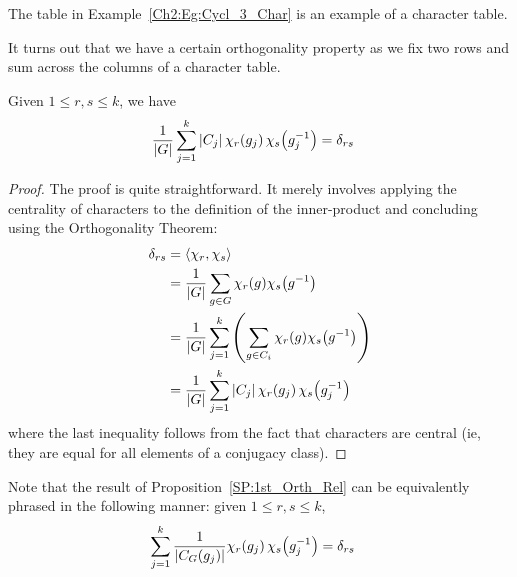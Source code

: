 The table in Example~\ref{Ch2:Eg:Cycl_3_Char} is an example of a character table.

It turns out that we have a certain orthogonality property as we fix two rows and sum across the columns of a character table.

\begin{boxproposition}\label{SP:1st_Orth_Rel}
    Given $1 \leq r, s \leq k$, we have
    \begin{align*}
        \frac{1}{\left\lvert G \right\rvert} \sum_{j=1}^{k} \left\lvert C_j \right\rvert \chi_r\!\left( g_j \right) \chi_s\!\left( g_j^{-1} \right) &= \delta_{rs}
    \end{align*}
\end{boxproposition}
\begin{proof}
    The proof is quite straightforward. It merely involves applying the centrality of characters to the definition of the inner-product and concluding using the Orthogonality Theorem:
    \begin{align*}
        \delta_{rs} &=
        \left\langle \chi_r, \chi_s \right\rangle \\
        &= \frac{1}{\left\lvert G \right\rvert} \sum_{g \in G} \chi_r(g) \chi_s\!\left( g^{-1} \right) \\
        &= \frac{1}{\left\lvert G \right\rvert} \sum_{j=1}^{k} \left( \sum_{g \in C_i} \chi_r(g) \chi_s\!\left( g^{-1} \right) \right) \\
        &= \frac{1}{\left\lvert G \right\rvert} \sum_{j=1}^{k} \left\lvert C_j \right\rvert \chi_r\!\left( g_j \right) \chi_s\!\left( g_j^{-1} \right)
    \end{align*}
    where the last inequality follows from the fact that characters are central (ie, they are equal for all elements of a conjugacy class).
\end{proof}
\begin{remark}
    Note that the result of Proposition~\ref{SP:1st_Orth_Rel} can be equivalently phrased in the following manner: given $1 \leq r, s \leq k$,
    \begin{align}
        \sum_{j=1}^{k} \frac{1}{\left\lvert C_G(g_j) \right\rvert} \chi_r\!\left( g_j \right) \chi_s\!\left( g_j^{-1} \right) &= \delta_{rs}
        \label{SP:Eq:1st_Orth_Rel_Conj_Cl}
    \end{align}
\end{remark}

